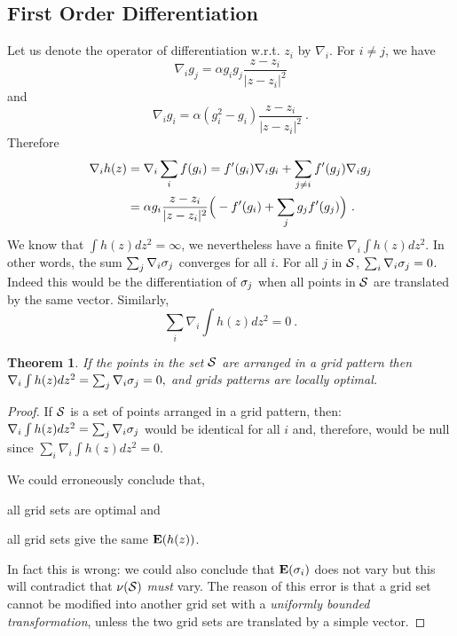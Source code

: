 \documentclass[12pt,english]{article}
\newtheorem{theorem}{Theorem}[section]
\begin{document}
\subsection{First Order Differentiation}
\label{sec:grid_first_order}

Let us denote the operator of differentiation w.r.t. $z_i$ by $\nabla_i$. For \mbox{$i\neq j$}, we have 
$$
\nabla_i g_j=\alpha g_ig_j\frac{z-z_i}{|z-z_i|^2}
$$ 
and 
$$
\nabla_i g_i=\alpha(g_i^2-g_i)\frac{z-z_i}{|z-z_i|^2}~.
$$ 
Therefore
\begin{align}
\nabla_i h(z)&=\nabla_i\sum_if(g_i)=f'(g_i)\nabla_ig_i+\sum_{j\neq i}f'(g_j)\nabla_ig_j \notag \\
&=\alpha g_i\frac{z-z_i}{|z-z_i|^2}\Big(-f'(g_i)+\sum_j g_jf'(g_j)\Big)~. \notag
\end{align}
We know that \mbox{$\int h(z)dz^2=\infty$}, we nevertheless have a finite $\nabla_i \int h(z)dz^2$. In other words, the sum $\sum_{j}\nabla_i\ss_j$ converges for all $i$. For all $j$ in ${\cal S}$, \mbox{$\sum_{i}\nabla_i\ss_j=0$}. Indeed this would be the differentiation of $\ss_j$ when all points in ${\cal S}$ are translated by the same vector. Similarly, 
$$
\sum_{i}\nabla_i\int  h(z)dz^2=0~.
$$ 

\begin{theorem}
If the points in the set ${\cal S}$ are arranged in a grid pattern then 
$
\nabla_i \int h(z)dz^2=\sum_{j}\nabla_i\ss_j=0,
$ 
and grids patterns are {\em locally optimal}. 
\end{theorem}

\begin{proof}
If ${\cal S}$ is a set of points arranged in a grid pattern, then: \mbox{$\nabla_i \int h(z)dz^2=\sum_{j}\nabla_i\ss_j$} would be identical for all $i$ and, therefore, would be null since \mbox{$\sum_{i}\nabla_i\int  h(z)dz^2=0$}. 

We could erroneously conclude that,
\begin{compactitem}[-]
\item all grid sets are optimal and
\item all grid sets give the same $\E(h(z))$.
\end{compactitem}
In fact this is wrong: we could also conclude that $\E(\ss_i)$ does not vary but this will contradict that $\nu({\cal S})$ {\em must} vary. The reason of this error is that a grid set cannot be modified into another grid set with a {\em uniformly bounded transformation}, unless the two grid sets are translated by a simple vector. 
\end{proof}
\end{document}
